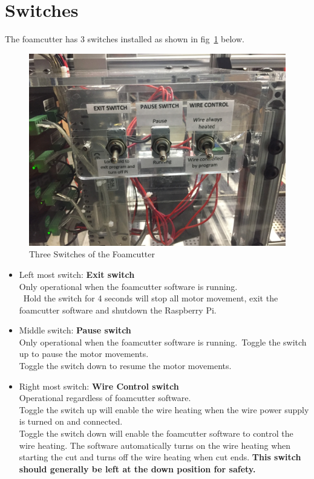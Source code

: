 \documentclass[titlepage,12pt,letter]{report}
\numberwithin{equation}{chapter}
\begin{document}
\section{Switches}
The foamcutter has 3 switches installed as shown in fig~\ref{fig:switch} below.
\begin{figure} [H]
	\includegraphics[width = 0.8\linewidth]{./Figures/electric.jpg}
	\caption{Three Switches of the Foamcutter}
	\label{fig:switch}
\end{figure}
\begin{itemize}[noitemsep,topsep=0pt]
	\item Left most switch: \textbf{Exit switch} \\
	Only operational when the foamcutter software is running. \\\
	Hold the switch for 4 seconds will stop all motor movement, exit the foamcutter software and shutdown the Raspberry Pi.
	\item Middle switch: \textbf{Pause switch}\\
	Only operational when the foamcutter software is running.\
	Toggle the switch up to pause the motor movements. \\
	Toggle the switch down to resume the motor movements.
	\item Right most switch: \textbf{Wire Control switch}\\
	Operational regardless of foamcutter software.\\
	Toggle the switch up will enable the wire heating when the wire power supply is turned on and connected.\\
	Toggle the switch down will enable the foamcutter software to control the wire heating. The software automatically turns on the wire heating when starting the cut and turns off the wire heating when cut ends. \textbf{This switch should generally be left at the down position for safety.}
\end{itemize}
\end{document}
